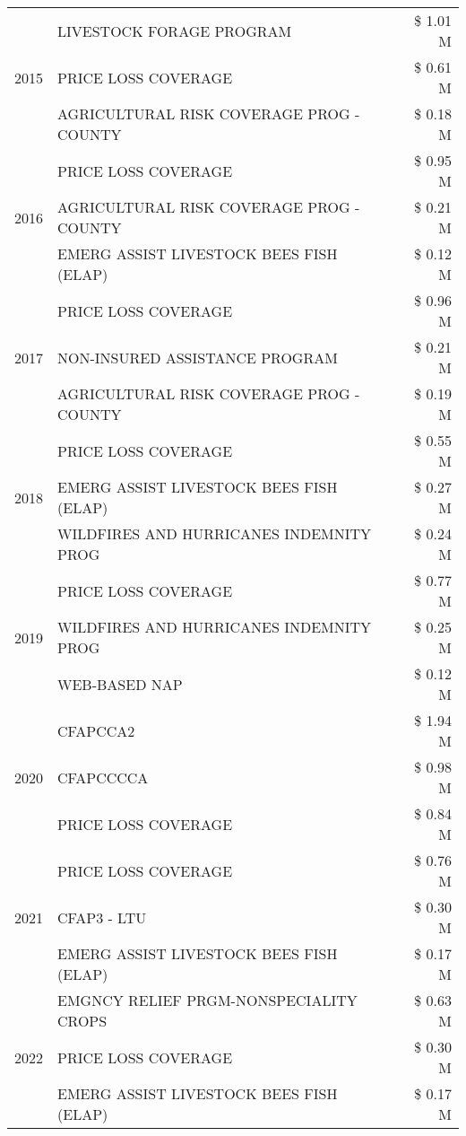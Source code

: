 \begin{tabular}{llr}
\cline{1-3}
\multirow[t]{3}{*}{2015} & LIVESTOCK FORAGE PROGRAM & \$ 1.01 M \\
 & PRICE LOSS COVERAGE & \$ 0.61 M \\
 & AGRICULTURAL RISK COVERAGE PROG - COUNTY & \$ 0.18 M \\
\cline{1-3}
\multirow[t]{3}{*}{2016} & PRICE LOSS COVERAGE & \$ 0.95 M \\
 & AGRICULTURAL RISK COVERAGE PROG - COUNTY & \$ 0.21 M \\
 & EMERG ASSIST LIVESTOCK BEES FISH (ELAP) & \$ 0.12 M \\
\cline{1-3}
\multirow[t]{3}{*}{2017} & PRICE LOSS COVERAGE & \$ 0.96 M \\
 & NON-INSURED ASSISTANCE PROGRAM & \$ 0.21 M \\
 & AGRICULTURAL RISK COVERAGE PROG - COUNTY & \$ 0.19 M \\
\cline{1-3}
\multirow[t]{3}{*}{2018} & PRICE LOSS COVERAGE & \$ 0.55 M \\
 & EMERG ASSIST LIVESTOCK BEES FISH (ELAP) & \$ 0.27 M \\
 & WILDFIRES AND HURRICANES INDEMNITY PROG & \$ 0.24 M \\
\cline{1-3}
\multirow[t]{3}{*}{2019} & PRICE LOSS COVERAGE & \$ 0.77 M \\
 & WILDFIRES AND HURRICANES INDEMNITY PROG & \$ 0.25 M \\
 & WEB-BASED NAP & \$ 0.12 M \\
\cline{1-3}
\multirow[t]{3}{*}{2020} & CFAPCCA2 & \$ 1.94 M \\
 & CFAPCCCCA & \$ 0.98 M \\
 & PRICE LOSS COVERAGE & \$ 0.84 M \\
\cline{1-3}
\multirow[t]{3}{*}{2021} & PRICE LOSS COVERAGE & \$ 0.76 M \\
 & CFAP3 - LTU & \$ 0.30 M \\
 & EMERG ASSIST LIVESTOCK BEES FISH (ELAP) & \$ 0.17 M \\
\cline{1-3}
\multirow[t]{3}{*}{2022} & EMGNCY RELIEF PRGM-NONSPECIALITY CROPS & \$ 0.63 M \\
 & PRICE LOSS COVERAGE & \$ 0.30 M \\
 & EMERG ASSIST LIVESTOCK BEES FISH (ELAP) & \$ 0.17 M \\
\cline{1-3}
\bottomrule
\end{tabular}
